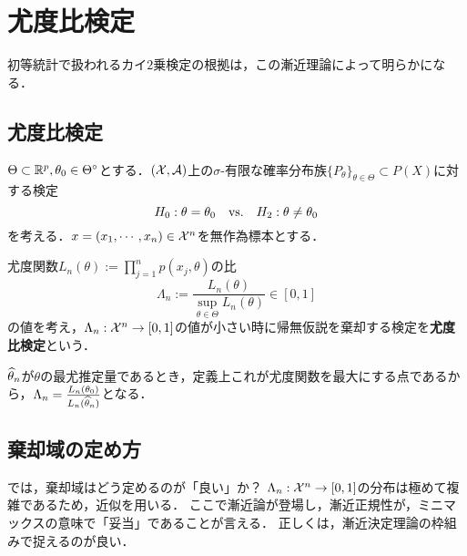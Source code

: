 \documentclass[uplatex,dvipdfmx]{jsreport}
\begin{document}
\section{尤度比検定}

\begin{tcolorbox}[colframe=ForestGreen, colback=ForestGreen!10!white,breakable,colbacktitle=ForestGreen!40!white,coltitle=black,fonttitle=\bfseries\sffamily,
title=]
    初等統計で扱われるカイ$2$乗検定の根拠は，この漸近理論によって明らかになる．
\end{tcolorbox}

\subsection{尤度比検定}

\begin{notation}
    $\Theta\subset\mathbb{R}^p,\theta_0\in\Theta^\circ$とする．$(\mathcal{X},\mathcal{A})$上の$\sigma$-有限な確率分布族$\{P_\theta\}_{\theta\in\Theta}\subset P(X)$に対する検定
    \[H_0:\theta=\theta_0\quad\mathrm{vs.}\quad H_2:\theta\ne\theta_0\]
    を考える．$x=(x_1,\cdots,x_n)\in\mathcal{X}^n$を無作為標本とする．
\end{notation}

\begin{definition}
    尤度関数$L_n(\theta):=\prod^n_{j=1}p(x_j,\theta)$の比
    \[\Lambda_n:=\frac{L_n(\theta)}{\sup_{\theta\in\Theta}L_n(\theta)}\in[0,1]\]
    の値を考え，$\Lambda_n:\mathcal{X}^n\to[0,1]$の値が小さい時に帰無仮説を棄却する検定を\textbf{尤度比検定}という．
\end{definition}
\begin{remark}
    $\widehat{\theta}_n$が$\theta$の最尤推定量であるとき，定義上これが尤度関数を最大にする点であるから，$\Lambda_n=\frac{L_n(\theta_0)}{L_n(\widehat{\theta}_n)}$となる．
\end{remark}

\subsection{棄却域の定め方}

\begin{tcolorbox}[colframe=ForestGreen, colback=ForestGreen!10!white,breakable,colbacktitle=ForestGreen!40!white,coltitle=black,fonttitle=\bfseries\sffamily,
title=]
    では，棄却域はどう定めるのが「良い」か？
    $\Lambda_n:\mathcal{X}^n\to[0,1]$の分布は極めて複雑であるため，近似を用いる．
    ここで漸近論が登場し，漸近正規性が，ミニマックスの意味で「妥当」であることが言える．
    正しくは，漸近決定理論の枠組みで捉えるのが良い．
\end{tcolorbox}
\end{document}
